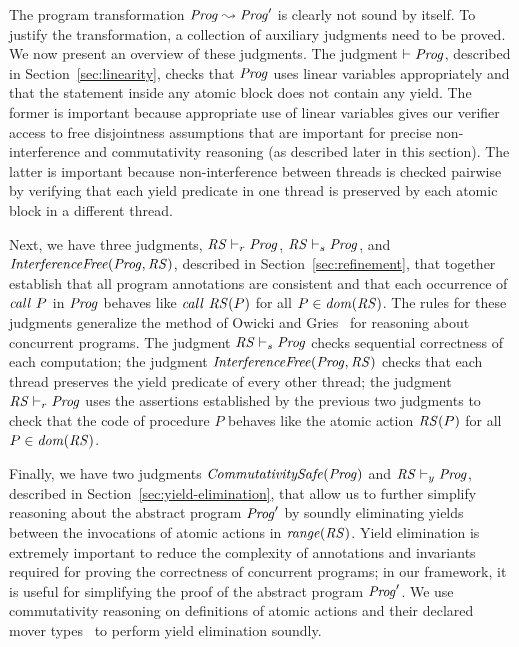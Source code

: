 The program transformation $\mathit{Prog} \leadsto \mathit{Prog}'$ is clearly not sound by itself.
To justify the transformation, a collection of auxiliary judgments need to be proved.
We now present an overview of these judgments.
The judgment $\vdash \mathit{Prog}$, described in Section~\ref{sec:linearity}, 
checks that $\mathit{Prog}$ uses linear variables appropriately and that the statement
inside any atomic block does not contain any yield.
The former is important because appropriate use of linear variables gives our verifier access to free disjointness
assumptions that are important for precise non-interference and commutativity reasoning (as described later in this section).
The latter is important because non-interference between threads is checked pairwise by verifying that each yield predicate
in one thread is preserved by each atomic block in a different thread.

Next, we have three judgments, $\mathit{RS} \vdash_r \mathit{Prog}$, $\mathit{RS} \vdash_s \mathit{Prog}$, and $\mathit{InterferenceFree}(\mathit{Prog}, \mathit{RS})$,
described in Section~\ref{sec:refinement},
that together establish that all program annotations are consistent and that 
each occurrence of $\mathit{call}\ P$ in $\mathit{Prog}$ behaves like $\mathit{call}\ \mathit{RS}(P)$ 
for all $P \in \mathit{dom}(\mathit{RS})$.
The rules for these judgments generalize the method of Owicki and Gries~\cite{OwickiG76} for reasoning about concurrent programs.
The judgment $\mathit{RS} \vdash_s \mathit{Prog}$ checks sequential correctness of each computation;
the judgment $\mathit{InterferenceFree}(\mathit{Prog}, \mathit{RS})$ checks that each thread preserves the
yield predicate of every other thread;
the judgment $\mathit{RS} \vdash_r \mathit{Prog}$ uses the assertions established by the previous two judgments to check that 
the code of procedure $P$ behaves like the atomic action $\mathit{RS}(P)$ for all $P\in\mathit{dom}(\mathit{RS})$.

Finally, we have two judgments $\mathit{CommutativitySafe}(\mathit{Prog})$ and $\mathit{RS} \vdash_y \mathit{Prog}$, 
described in Section~\ref{sec:yield-elimination}, that allow us to further simplify reasoning 
about the abstract program $\mathit{Prog}'$ by soundly eliminating yields between the invocations of atomic actions in $\mathit{range}(\mathit{RS})$.
Yield elimination is extremely important to reduce the complexity of annotations and invariants 
required for proving the correctness of concurrent programs;
in our framework, it is useful for simplifying the proof of the abstract program $\mathit{Prog}'$.
We use commutativity reasoning on definitions of atomic actions and their declared mover types~\cite{FlanaganFLQ08,ElmasQT09}
to perform yield elimination soundly.

